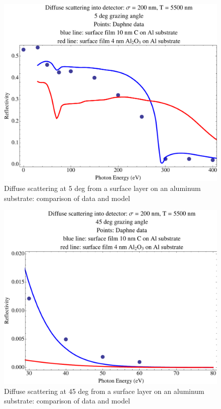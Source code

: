 \documentclass[11pt]{article}
\begin{document}
   \begin{figure}
  \centering
  \includegraphics[width=4.5in]{Daphne-fit-5-deg}
   \caption{\label{f:Daphne.fit.5.deg}
   Diffuse scattering at 5 deg from a surface layer on an aluminum substrate: comparison of data and model}
   \end{figure}
      \begin{figure}
  \centering
  \includegraphics[width=4.5in]{Daphne-fit-45-deg}
   \caption{\label{f:Daphne.fit.45.deg}
   Diffuse scattering at 45 deg from a surface layer on an aluminum substrate: comparison of data and model}
   \end{figure}
\end{document}
